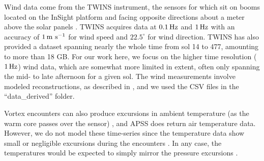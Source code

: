 \documentclass[linenumbers,trackchanges]{aastex63}
\begin{document}
Wind data come from the TWINS instrument, the sensors for which sit on booms located on the InSight platform and facing opposite directions about a meter above the solar panels \citep{2020NatGe..13..190B}. TWINS acquires data at $0.1\, {\rm Hz}$ and $1\, {\rm Hz}$ with an accuracy of $1\, {\rm m\ s^{-1}}$ for wind speed and $22.5^\circ$ for wind direction.  TWINS has also provided a dataset spanning nearly the whole time from sol 14 to 477, amounting to more than 18 GB. For our work here, we focus on the higher time resolution ($1\, {\rm Hz}$) wind data, which are somewhat more limited in extent, often only spanning the mid- to late afternoon for a given sol. The wind measurements involve modeled reconstructions, as described in \citet{Banfield2019}, and we used the CSV files in the ``data\_derived'' folder. 

Vortex encounters can also produce excursions in ambient temperature (as the warm core passes over the sensor) \citep{2016SSRv..203...39M}, and APSS does return air temperature data. However, we do not model these time-series since the temperature data show small or negligible excursions during the encounters \citep{2021Icar..35514119L}. In any case, the temperatures would be expected to simply mirror the pressure excursions \citep{2016Icar..271..326L}.
\end{document}
